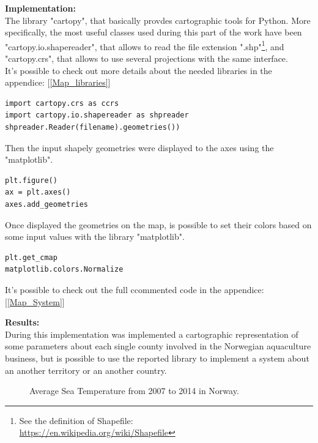 \textbf{Implementation:}\\
The library "cartopy", that basically provdes cartographic tools for Python. More specifically, the most useful classes used during this part of the work have been "cartopy.io.shapereader", that allows to read the file extension ".shp"\footnote{See the definition of Shapefile: \\ \url{https://en.wikipedia.org/wiki/Shapefile}}, and "cartopy.crs", that allows to use several projections with the same interface.\\
It's possible to check out more details about the needed libraries in the appendice: [\ref{Map_libraries}]
\begin{lstlisting}
import cartopy.crs as ccrs
import cartopy.io.shapereader as shpreader
shpreader.Reader(filename).geometries())
\end{lstlisting}

\newpage

Then the input shapely geometries were displayed  to the axes using the "matplotlib".
\begin{lstlisting}
plt.figure()
ax = plt.axes()
axes.add_geometries
\end{lstlisting}

Once displayed the geometries on the map, is possible to set their colors based on some input values with the library "matplotlib".
\begin{lstlisting}
plt.get_cmap
matplotlib.colors.Normalize
\end{lstlisting}

It's possible to check out the full ccommented code in the appendice: [\ref{Map_System}]

\textbf{Results:} \\
During this implementation was implemented a cartographic representation of some parameters about each single county involved in the Norwegian aquaculture business, but is possible to use the reported library to implement a system about an another territory or an another country.
\begin{figure}[H]
    \caption{Average Sea Temperature from 2007 to 2014 in Norway.}
\end{figure}
